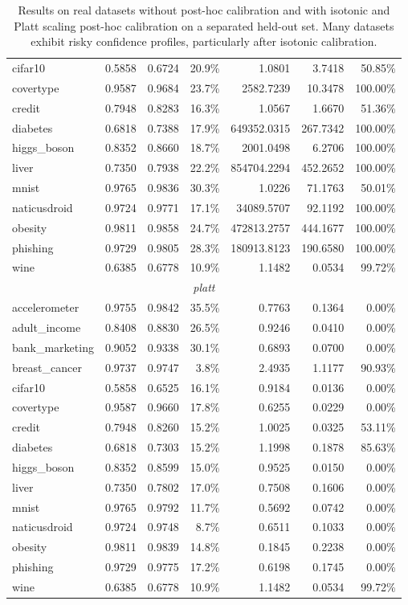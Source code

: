 \documentclass{article}
\theoremstyle{plain}
\theoremstyle{definition}
\theoremstyle{remark}
\begin{document}
\begin{table}[ht]
\begin{tabular}{lrrrrrr}
cifar10 & 0.5858 & 0.6724 & 20.9\% & 1.0801 & 3.7418 & 50.85\% \\
covertype & 0.9587 & 0.9684 & 23.7\% & 2582.7239 & 10.3478 & 100.00\% \\
credit & 0.7948 & 0.8283 & 16.3\% & 1.0567 & 1.6670 & 51.36\% \\
diabetes & 0.6818 & 0.7388 & 17.9\% & 649352.0315 & 267.7342 & 100.00\% \\
higgs\_boson & 0.8352 & 0.8660 & 18.7\% & 2001.0498 & 6.2706 & 100.00\% \\
liver & 0.7350 & 0.7938 & 22.2\% & 854704.2294 & 452.2652 & 100.00\% \\
mnist & 0.9765 & 0.9836 & 30.3\% & 1.0226 & 71.1763 & 50.01\% \\
naticusdroid & 0.9724 & 0.9771 & 17.1\% & 34089.5707 & 92.1192 & 100.00\% \\
obesity & 0.9811 & 0.9858 & 24.7\% & 472813.2757 & 444.1677 & 100.00\% \\
phishing & 0.9729 & 0.9805 & 28.3\% & 180913.8123 & 190.6580 & 100.00\% \\
wine & 0.6385 & 0.6778 & 10.9\% & 1.1482 & 0.0534 & 99.72\% \\
\midrule
\multicolumn{7}{c}{\textit{platt}} \\
\midrule
accelerometer & 0.9755 & 0.9842 & 35.5\% & 0.7763 & 0.1364 & 0.00\% \\
adult\_income & 0.8408 & 0.8830 & 26.5\% & 0.9246 & 0.0410 & 0.00\% \\
bank\_marketing & 0.9052 & 0.9338 & 30.1\% & 0.6893 & 0.0700 & 0.00\% \\
breast\_cancer & 0.9737 & 0.9747 & 3.8\% & 2.4935 & 1.1177 & 90.93\% \\
cifar10 & 0.5858 & 0.6525 & 16.1\% & 0.9184 & 0.0136 & 0.00\% \\
covertype & 0.9587 & 0.9660 & 17.8\% & 0.6255 & 0.0229 & 0.00\% \\
credit & 0.7948 & 0.8260 & 15.2\% & 1.0025 & 0.0325 & 53.11\% \\
diabetes & 0.6818 & 0.7303 & 15.2\% & 1.1998 & 0.1878 & 85.63\% \\
higgs\_boson & 0.8352 & 0.8599 & 15.0\% & 0.9525 & 0.0150 & 0.00\% \\
liver & 0.7350 & 0.7802 & 17.0\% & 0.7508 & 0.1606 & 0.00\% \\
mnist & 0.9765 & 0.9792 & 11.7\% & 0.5692 & 0.0742 & 0.00\% \\
naticusdroid & 0.9724 & 0.9748 & 8.7\% & 0.6511 & 0.1033 & 0.00\% \\
obesity & 0.9811 & 0.9839 & 14.8\% & 0.1845 & 0.2238 & 0.00\% \\
phishing & 0.9729 & 0.9775 & 17.2\% & 0.6198 & 0.1745 & 0.00\% \\
wine & 0.6385 & 0.6778 & 10.9\% & 1.1482 & 0.0534 & 99.72\% \\
\bottomrule
\end{tabular}
\caption{Results on real datasets without post-hoc calibration and with isotonic and Platt scaling post-hoc calibration on a separated held-out set. Many datasets exhibit risky confidence profiles, particularly after isotonic calibration.}
\label{tab:report_real}
\end{table}
\end{document}

